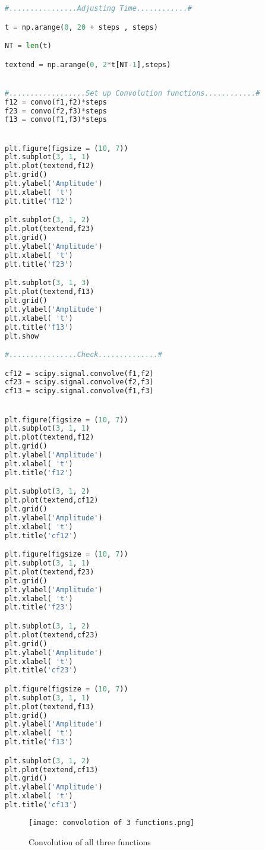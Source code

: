 \documentclass[11pt,a4]{report}
\begin{document}
\begin{lstlisting}[language=Python]
#................Adjusting Time............#

t = np.arange(0, 20 + steps , steps)

NT = len(t)

textend = np.arange(0, 2*t[NT-1],steps)


#..................Set up Convolution functions............#
f12 = convo(f1,f2)*steps
f23 = convo(f2,f3)*steps
f13 = convo(f1,f3)*steps


plt.figure(figsize = (10, 7))
plt.subplot(3, 1, 1)
plt.plot(textend,f12)
plt.grid()
plt.ylabel('Amplitude')
plt.xlabel( 't')
plt.title('f12')

plt.subplot(3, 1, 2)
plt.plot(textend,f23)
plt.grid()
plt.ylabel('Amplitude')
plt.xlabel( 't')
plt.title('f23')

plt.subplot(3, 1, 3)
plt.plot(textend,f13)
plt.grid()
plt.ylabel('Amplitude')
plt.xlabel( 't')
plt.title('f13')
plt.show

#................Check..............#

cf12 = scipy.signal.convolve(f1,f2)
cf23 = scipy.signal.convolve(f2,f3)
cf13 = scipy.signal.convolve(f1,f3)


plt.figure(figsize = (10, 7))
plt.subplot(3, 1, 1)
plt.plot(textend,f12)
plt.grid()
plt.ylabel('Amplitude')
plt.xlabel( 't')
plt.title('f12')

plt.subplot(3, 1, 2)
plt.plot(textend,cf12)
plt.grid()
plt.ylabel('Amplitude')
plt.xlabel( 't')
plt.title('cf12')

plt.figure(figsize = (10, 7))
plt.subplot(3, 1, 1)
plt.plot(textend,f23)
plt.grid()
plt.ylabel('Amplitude')
plt.xlabel( 't')
plt.title('f23')

plt.subplot(3, 1, 2)
plt.plot(textend,cf23)
plt.grid()
plt.ylabel('Amplitude')
plt.xlabel( 't')
plt.title('cf23')

plt.figure(figsize = (10, 7))
plt.subplot(3, 1, 1)
plt.plot(textend,f13)
plt.grid()
plt.ylabel('Amplitude')
plt.xlabel( 't')
plt.title('f13')

plt.subplot(3, 1, 2)
plt.plot(textend,cf13)
plt.grid()
plt.ylabel('Amplitude')
plt.xlabel( 't')
plt.title('cf13')

\end{lstlisting}
\newpage
\begin{figure}[h!]
    \begin{center}
  \caption{Convolution of all three functions}
  \texttt{[image: convolotion of 3 functions.png]}
\end{center}
\end{figure}
\end{document}
